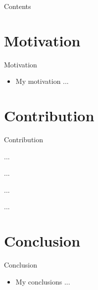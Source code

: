 

\frame{\titlepage}

\begin{frame}{Contents}
  \tableofcontents
\end{frame}

\section{Motivation}

\begin{frame}{Motivation}
  \begin{itemize}
    \item My motivation ...
  \end{itemize}
\end{frame}

\section{Contribution}

\begin{frame}{Contribution}
  \begin{definition}[My definition]
    ...
  \end{definition}

  \begin{example}[My example]
    ...
  \end{example}
  
  \begin{lemma}[My lemma]
    ...
  \end{lemma}
  
  \begin{theorem}[My theorem]
    ...
  \end{theorem}

\end{frame}

\section{Conclusion}
\begin{frame}{Conclusion}
    \begin{itemize}
    \item My conclusions ...
  \end{itemize}
\end{frame}




